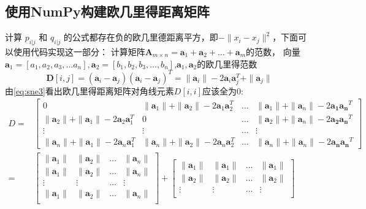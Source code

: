 \subsection{使用NumPy构建欧几里得距离矩阵}
计算 $p_{i|j}$ 和 $q_{i|j}$ 的公式都存在负的欧几里德距离平方，即$-\|x_i - x_j\|^2$，下面可以使用代码实现这一部分：
计算矩阵$\mathbf{A}_{m\times n}=\mathbf{a}_1+\mathbf{a}_2+\ldots+\mathbf{a}_m$的范数，
向量$\mathbf{a}_1=[a_1,a_2,a_3,...a_n],\mathbf{a}_2=[b_1,b_2,b_3,\ldots,b_n]$,$\mathbf{a}_{1},\mathbf{a}_2$的欧几里得范数
\begin{equation}\label{eq:sne4}
	\mathbf{D}[i,j]=(\mathbf{a}_i-\mathbf{a}_j)(\mathbf{a}_i-\mathbf{a}_j)^T=\|\mathbf{a}_i\|-2\mathbf{a}_i\mathbf{a}_j^T+\|\mathbf{a}_j\|
\end{equation}
由\ref{eq:sne3}看出欧几里得距离矩阵对角线元素$D[i,i]$应该全为0:
\begin{equation}\label{eq:sne5}
	\begin{split}
		D = &\begin{bmatrix}
		0& \|\mathbf{a}_1\|+\|\mathbf{a}_2\|-2\mathbf{a}_1\mathbf{a}_2^T& \ldots&\|\mathbf{a}_1\|+\|\mathbf{a}_n\|-2\mathbf{a_1}\mathbf{a_n}^T\\
		\|\mathbf{a}_2\|+\|\mathbf{a}_1\|-2\mathbf{a}_2\mathbf{a}_1^T&0& \ldots& \|\mathbf{a}_2\|+\|\mathbf{a}_n\|-2\mathbf{a_2}\mathbf{a_n}^T\\
		\vdots&\vdots&\ldots&\vdots\\
		\|\mathbf{a}_n\|+\|\mathbf{a}_1\|-2\mathbf{a}_n\mathbf{a}_1^T&\|\mathbf{a}_n\|+\|\mathbf{a}_2\|-2\mathbf{a}_n\mathbf{a}_2^T& \ldots& \|\mathbf{a}_n\|+\|\mathbf{a}_n\|-2\mathbf{a_n}\mathbf{a_n}^T
		    \end{bmatrix}\\
		    =&\begin{bmatrix}
			\|\mathbf{a}_1\|&\|\mathbf{a}_2\|&\ldots&\|\mathbf{a}_n\|\\
			\|\mathbf{a}_1\|&\|\mathbf{a}_2\|&\ldots&\|\mathbf{a}_n\|\\
			\vdots&\vdots&\ldots&\vdots\\
			\|\mathbf{a}_1\|&\|\mathbf{a}_2\|&\ldots&\|\mathbf{a}_n\|\\
			\end{bmatrix}+\begin{bmatrix}
			\|\mathbf{a}_1\|&\|\mathbf{a}_1\|&\ldots&\|\mathbf{a}_1\|\\
			\|\mathbf{a}_2\|&\|\mathbf{a}_2\|&\ldots&\|\mathbf{a}_2\|\\
			\vdots&\vdots&\ldots&\vdots\\

\end{bmatrix}
\end{split}
\end{equation}
